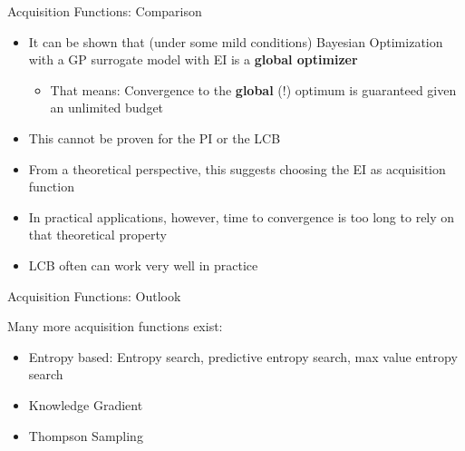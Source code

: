 \documentclass[11pt,compress,t,notes=noshow, xcolor=table]{beamer}
\begin{document}
\begin{vbframe}{Acquisition Functions: Comparison}

\begin{itemize}
  \item It can be shown that (under some mild conditions) Bayesian Optimization with a GP surrogate model with EI is a \textbf{global optimizer}
  \begin{itemize}
    \item That means: Convergence to the \textbf{global} (!) optimum is guaranteed given an unlimited budget
  \end{itemize}
  \item This cannot be proven for the PI or the LCB
  \item From a theoretical perspective, this suggests choosing the EI as acquisition function
  \item In practical applications, however, time to convergence is too long to rely on that theoretical property
  \item LCB often can work very well in practice
\end{itemize}

\end{vbframe}

\begin{vbframe}{Acquisition Functions: Outlook}

Many more acquisition functions exist:

\begin{itemize}
  \item Entropy based: Entropy search, predictive entropy search, max value entropy search
  \item Knowledge Gradient
  \item Thompson Sampling
\end{itemize}

\end{vbframe}
\end{document}
